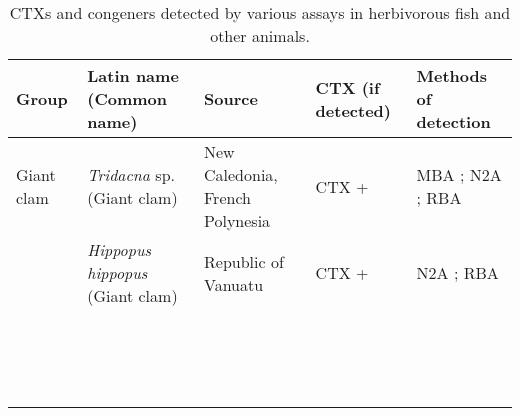 \documentclass[12pt]{article}
\begin{document}
\begin{table}
\caption{CTXs and congeners detected by various assays in herbivorous fish and other animals.}
\label{tbl:HerbTable}
\begin{tabular}{| p{2cm} | p{3cm} | p{4.5cm} | p{2cm} | p{3cm} | }
\hline
\textbf{Group} & \textbf{Latin name} (Common name) & \textbf{Source} & \textbf{CTX (if detected)} & \textbf{Methods of detection} \\
\hline
 Giant clam &  \emph{Tridacna} sp. (Giant clam) & New Caledonia, French Polynesia \cite{laurent2012ciguatera} & CTX +\cite{laurent2012ciguatera} & MBA \cite{laurent2012ciguatera}; N2A \cite{laurent2012ciguatera}; RBA \cite{laurent2012ciguatera} \\
  & \emph{Hippopus hippopus} (Giant clam)  & Republic of Vanuatu \cite{laurent2012ciguatera} & CTX +\cite{laurent2012ciguatera} & N2A \cite{laurent2012ciguatera}; RBA \cite{laurent2012ciguatera} \\
  \hline
  & \emph{} &  &  & \\
  &  \emph{} &  &  & \\
  & \emph{}  &  &  & \\
  & \emph{} &  &  & \\
  &  \emph{} &  &  & \\
  & \emph{}  &  &  & \\
  & \emph{} &  &  & \\
  &  \emph{} &  &  & \\
  & \emph{}  &  &  & \\
  & \emph{} &  &  & \\
  &  \emph{} &  &  & \\
  & \emph{}  &  &  & \\
  & \emph{} &  &  & \\
  &  \emph{} &  &  & \\
  & \emph{}  &  &  & \\
  & \emph{} &  &  & \\
\end{tabular}
\end{table}
\FloatBarrier
\end{document}

